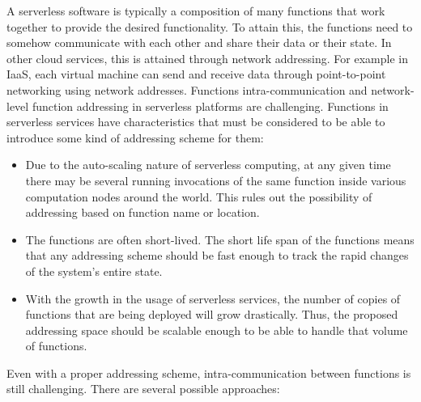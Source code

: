 A serverless software is typically a composition of many functions that work together to provide the desired functionality. To attain this, the functions need to somehow communicate with each other and share their data or their state. In other cloud services, this is attained through network addressing. For example in IaaS, each virtual machine can send and receive data through point-to-point networking using network addresses. 
Functions intra-communication and network-level function addressing in serverless platforms are challenging. Functions in serverless services have characteristics that must be considered to be able to introduce some kind of addressing scheme for them:
\begin{itemize}
\item Due to the auto-scaling nature of serverless computing, at any given time there may be several running invocations of the same function inside various computation nodes around the world. This rules out the possibility of addressing based on function name or location.
\item The functions are often short-lived. The short life span of the functions means that any addressing scheme should be fast enough to track the rapid changes of the system's entire state.
\item With the growth in the usage of serverless services, the number of copies of functions that are being deployed will grow drastically. Thus, the proposed addressing space should be scalable enough to be able to handle that volume of functions. 
\end{itemize}
Even with a proper addressing scheme, intra-communication between functions is still challenging. There are several possible approaches:
